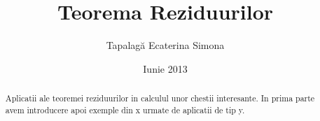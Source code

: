 \documentclass[12pt,a4paper]{article}
\begin{document}
\title{Teorema Reziduurilor}
\author{Tapalagă Ecaterina Simona}
\date{Iunie 2013}
\maketitle

\begin{abstract}
    Aplicatii ale teoremei reziduurilor in calculul unor chestii interesante.
    In prima parte avem introducere apoi exemple din x urmate de aplicatii de tip y.
\end{abstract}

\tableofcontents

\clearpage


%
%
%
\end{document}
